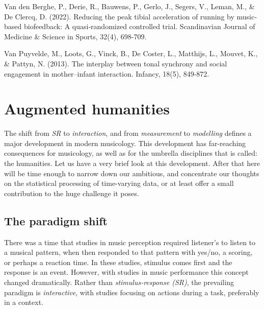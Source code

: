 \documentclass[
]{book}
\newenvironment{Shaded}{\begin{snugshade}}{\end{snugshade}}
\newcommand{\AttributeTok}[1]{\textcolor[rgb]{0.13,0.29,0.53}{#1}}
\newcommand{\FunctionTok}[1]{\textcolor[rgb]{0.13,0.29,0.53}{\textbf{#1}}}
\newcommand{\NormalTok}[1]{#1}
\newcommand{\SpecialCharTok}[1]{\textcolor[rgb]{0.81,0.36,0.00}{\textbf{#1}}}
\newcommand{\StringTok}[1]{\textcolor[rgb]{0.31,0.60,0.02}{#1}}
\theoremstyle{definition}
\theoremstyle{definition}
\theoremstyle{definition}
\theoremstyle{definition}
\theoremstyle{remark}
\begin{document}
Van den Berghe, P., Derie, R., Bauwens, P., Gerlo, J., Segers, V., Leman, M., \& De Clercq, D. (2022). Reducing the peak tibial acceleration of running by music‐based biofeedback: A quasi‐randomized controlled trial. Scandinavian Journal of Medicine \& Science in Sports, 32(4), 698-709.

Van Puyvelde, M., Loots, G., Vinck, B., De Coster, L., Matthijs, L., Mouvet, K., \& Pattyn, N. (2013). The interplay between tonal synchrony and social engagement in mother--infant interaction. Infancy, 18(5), 849-872.

\hypertarget{chapAugHumanities}{%
\chapter{Augmented humanities}\label{chapAugHumanities}}

\begin{Shaded}
\end{Shaded}

The shift from \emph{SR} to \emph{interaction}, and from \emph{measurement} to \emph{modelling} defines a major development in modern musicology. This development has far-reaching consequences for musicology, as well as for the umbrella disciplines that is called: the humanities.
Let us have a very brief look at this development.
After that here will be time enough to narrow down our ambitious, and concentrate our thoughts on the statistical processing of time-varying data, or at least offer a small contribution to the huge challenge it poses.

\hypertarget{the-paradigm-shift}{%
\section{The paradigm shift}\label{the-paradigm-shift}}

There was a time that studies in music perception required listener's to listen to a musical pattern, when then responded to that pattern with yes/no, a scoring, or perhaps a reaction time. In these studies, stimulus comes first and the response is an event.
However, with studies in music performance this concept changed dramatically.
Rather than \emph{stimulus-response (SR)}, the prevailing paradigm is \emph{interactive}, with studies focusing on actions during a task, preferably in a context.
\end{document}
